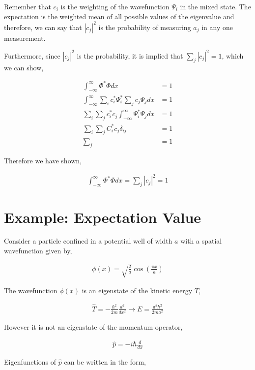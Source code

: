 \documentclass[11pt]{amsart}
\begin{document}
Remember that $c_i$ is the weighting of the wavefunction $\Psi_i$ in the mixed state. The expectation is the weighted mean of all possible values of the eigenvalue and therefore, we can say that ${|c_j|}^2$ is the probability of measuring $a_j$ in any one measurement.

Furthermore, since ${|c_j|}^2$ is the probability, it is implied that $\sum\limits_j {|c_j|}^2 = 1$, which we can show,

\begin{align*}
  \int_{-\infty}^{\infty} \Phi^*\Phi dx &= 1 \\
  \int_{-\infty}^{\infty} \sum\limits_i c_i^* \Psi_i^* \sum\limits_j c_j \Psi_j dx &= 1 \\
  \sum\limits_i \sum\limits_j c_i^* c_j \int_{-\infty}^{\infty} \Psi_i^* \Psi_j dx &= 1 \\
  \sum\limits_i \sum\limits_j C_i^* c_j \delta_{ij} &= 1 \\
  \sum\limits_j &= 1
\end{align*}

Therefore we have shown,

\begin{align*}
  \int_{-\infty}^{\infty} \Phi^*\Phi dx = \sum\limits_j {|c_j|}^2 = 1
\end{align*}

\section{Example: Expectation Value}

Consider a particle confined in a potential well of width $a$ with a spatial wavefunction given by,

\begin{align*}
  \phi(x) = \sqrt{\frac{2}{a}} \cos{\left(\frac{\pi x}{a}\right)}
\end{align*}

The wavefunction $\phi(x)$ is an eigenstate of the kinetic energy $T$,

\begin{align*}
  \hat{T} = -\frac{\hbar^2}{2m} \frac{d^2}{dx^2} \to E = \frac{\pi^2\hbar^2}{2ma^2}
\end{align*}

However it is not an eigenstate of the momentum operator,

\begin{align*}
  \hat{p} = -i\hbar\frac{d}{dx}
\end{align*}

Eigenfunctions of $\hat{p}$ can be written in the form,
\end{document}
